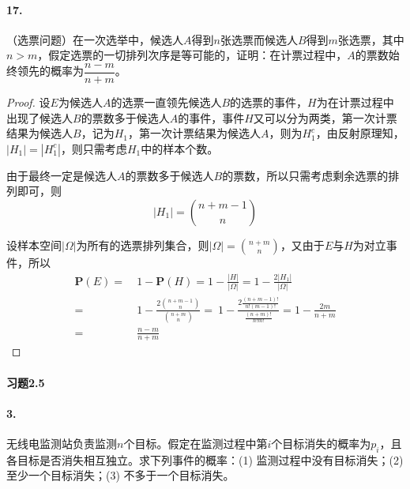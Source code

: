 \documentclass[12pt, a4paper, oneside]{ctexart}
\begin{document}
\paragraph{17.}（选票问题）在一次选举中，候选人$A$得到$n$张选票而候选人$B$得到$m$张选票，其中$n>m$，假定选票的一切排列次序是等可能的，证明：在计票过程中，$A$的票数始终领先的概率为$\dfrac{n-m}{n+m}$。
\begin{proof}
    设$E$为候选人$A$的选票一直领先候选人$B$的选票的事件，$H$为在计票过程中出现了候选人$B$的票数多于候选人$A$的事件，事件$H$又可以分为两类，第一次计票结果为候选人$B$，记为$H_1$，第一次计票结果为候选人$A$，则为$H_1^c$，由反射原理知，$|H_1| = |H_1^c|$，则只需考虑$H_1$中的样本个数。

    由于最终一定是候选人$A$的票数多于候选人$B$的票数，所以只需考虑剩余选票的排列即可，则
    \begin{equation*}
        |H_1| = \binom{n+m-1}{n}
    \end{equation*}

    设样本空间$|\Omega|$为所有的选票排列集合，则$|\Omega| = \binom{n+m}{n}$，又由于$E$与$H$为对立事件，所以
    \begin{equation*}
        \begin{aligned}
            \textbf{P}(E) =&\ 1-\textbf{P}(H)=1-\frac{|H|}{|\Omega|}= 1-\frac{2|H_1|}{|\Omega|}\\
            =&\ 1-\frac{2\binom{n+m-1}{n}}{\binom{n+m}{n}} =\ 1-\frac{2\frac{(n+m-1)!}{n!(m-1)!}}{\frac{(n+m)!}{n!m!}}   = 1-\frac{2m}{n+m}\\
            =&\ \frac{n-m}{n+m}
        \end{aligned}
    \end{equation*}
\end{proof}
\paragraph{习题2.5}
\paragraph{3.}无线电监测站负责监测$n$个目标。假定在监测过程中第$i$个目标消失的概率为$p_i$，且各目标是否消失相互独立。求下列事件的概率：(1) 监测过程中没有目标消失；(2) 至少一个目标消失；(3) 不多于一个目标消失。
\end{document}
